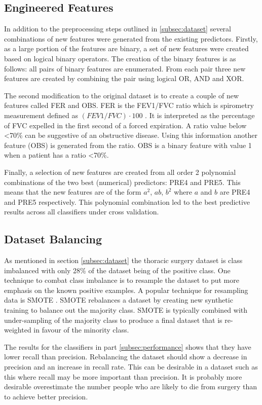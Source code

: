\documentclass[journal]{IEEEtran}
\begin{document}
\subsection{Engineered Features}
In addition to the preprocessing steps outlined in \ref{subsec:dataset} several combinations of new features were generated from the existing predictors. Firstly, as a large portion of the features are binary, a set of new features were created based on logical binary operators. The creation of the binary features is as follows: all pairs of binary features are enumerated. From each pair three new features are created by combining the pair using logical OR, AND and XOR.

The second modification to the original dataset is to create a couple of new features called FER and OBS. FER is the FEV1/FVC ratio which is spirometry measurement defined as $(FEV1/FVC) \cdot 100$ \cite{patient2016spirometry}. It is interpreted as the percentage of FVC expelled in the first second of a forced expiration. A ratio value below <70\% can be suggestive of an obstructive disease. Using this information another feature (OBS) is generated from the ratio. OBS is a binary feature with value 1 when a patient has a ratio <70\%.

Finally, a selection of new features are created from all order 2 polynomial combinations of the two best (numerical) predictors: PRE4 and PRE5. This means that the new features are of the form $a^2$, $ab$, $b^2$ where $a$ and $b$ are PRE4 and PRE5 respectively. This polynomial combination led to the best predictive results across all classifiers under cross validation.


\subsection{Dataset Balancing}
\label{subsec:dataset-balancing}
As mentioned in section \ref{subsec:dataset} the thoracic surgery dataset is class imbalanced with only 28\% of the dataset being of the positive class. One technique to combat class imbalance is to resample the dataset to put more emphasis on the known positive examples. A popular technique for resampling data is SMOTE \cite{chawla2002smote}. SMOTE rebalances a dataset by creating new synthetic training to balance out the majority class. SMOTE is typically combined with under-sampling of the majority class to produce a final dataset that is re-weighted in favour of the minority class. 

The results for the classifiers in part \ref{subsec:performance} shows that they have lower recall than precision. Rebalancing the dataset should show a decrease in precision and an increase in recall rate. This can be desirable in a dataset such as this where recall may be more important than precision. It is probably more desirable overestimate the number people who are likely to die from surgery than to achieve better precision.
\end{document}
